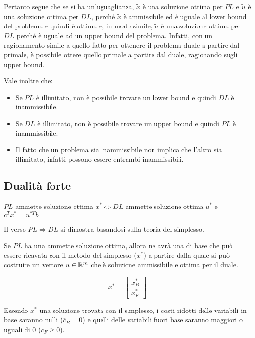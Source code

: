 Pertanto segue che se si ha un'uguaglianza, $\tilde{x}$ è una soluzione ottima per $PL$ e $\tilde{u}$ è una soluzione ottima per $DL$, perché $\tilde{x}$ è ammissibile ed è uguale al lower bound del problema e quindi è ottima e, in modo simile, $\tilde{u}$ è una soluzione ottima per $DL$ perché è uguale ad un upper bound del problema.
Infatti, con un ragionamento simile a quello fatto per ottenere il problema duale a partire dal primale, è possibile ottere quello primale a partire dal duale, ragionando sugli upper bound.

Vale inoltre che:

\begin{itemize}
	\item Se $PL$ è illimitato, non è possibile trovare un lower bound e quindi $DL$ è inammissibile.
	\item Se $DL$ è illimitato, non è possibile trovare un upper bound e quindi $PL$ è inammissibile.
	\item Il fatto che un problema sia inammissibile non implica che l'altro sia illimitato, infatti possono essere entrambi inammissibili.
\end{itemize}

\subsection{Dualità forte}

\begin{center}
	$PL$ ammette soluzione ottima $x^* \Leftrightarrow DL$ ammette soluzione ottima $u^*$ e $c^Tx^* = u^{*T}b$ 
\end{center}

Il verso $PL\Rightarrow DL$ si dimostra basandosi sulla teoria del simplesso.

Se $PL$ ha una ammette soluzione ottima, allora ne avrà una di base che può essere ricavata con il metodo del simplesso ($x^*$) a partire dalla quale si può costruire un vettore $u \in \mathbb{R}^m$ che è soluzione ammissibile e ottima per il duale.

$$
x^* = \begin{bmatrix}
x_{B}^* \\
x_{F}^*
\end{bmatrix}
$$

Essendo $x^*$ una soluzione trovata con il simplesso, i costi ridotti delle variabili in base saranno nulli ($\overline{c}_B = 0$) e quelli delle variabili fuori base saranno maggiori o uguali di 0 ($\overline{c}_F \geq 0$).

